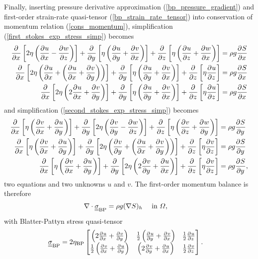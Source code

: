 Finally, inserting pressure derivative approximation (\ref{bp_pressure_gradient}) and first-order strain-rate quasi-tensor (\ref{bp_strain_rate_tensor}) into conservation of momentum relation (\ref{cons_momentum}), simplification (\ref{first_stokes_exp_stress_simp}) becomes
{\tiny
\begin{align}
  \parder{}{x} \left[2\eta \left( \parder{u}{x} - \parder{w}{z} \right) \right]  + \parder{}{y} \left[\eta \left( \parder{u}{y} + \parder{v}{x} \right) \right] + \parder{}{z} \left[\eta \left( \parder{u}{z} + \parder{w}{x} \right) \right] &= \rho g\parder{S}{x} \notag \\
  \parder{}{x} \left[2\eta \left( \parder{u}{x} + \left( \parder{u}{x} + \parder{v}{y} \right)\right) \right]  + \parder{}{y} \left[\eta \left( \parder{u}{y} + \parder{v}{x} \right) \right] + \parder{}{z} \left[\eta \parder{u}{z} \right] &= \rho g\parder{S}{x} \notag \\
  \label{first_stokes_exp_strain_simp}
  \parder{}{x} \left[2\eta \left( 2\parder{u}{x} + \parder{v}{y} \right) \right]  + \parder{}{y} \left[\eta \left( \parder{u}{y} + \parder{v}{x} \right) \right] + \parder{}{z} \left[\eta \parder{u}{z} \right] &= \rho g\parder{S}{x}
\end{align}}
and simplification (\ref{second_stokes_exp_stress_simp}) becomes 
{\tiny
\begin{align}
  \parder{}{x} \left[\eta \left( \parder{v}{x} + \parder{u}{y} \right) \right]  + \parder{}{y} \left[2\eta \left( \parder{v}{y} - \parder{w}{z} \right) \right] + \parder{}{z} \left[\eta \left( \parder{v}{z} + \parder{w}{y} \right) \right] &= \rho g \parder{S}{y} \notag \\
  \parder{}{x} \left[\eta \left( \parder{v}{x} + \parder{u}{y} \right) \right]  + \parder{}{y} \left[2\eta \left( \parder{v}{y} + \left(\parder{u}{x} + \parder{v}{y} \right)\right) \right] + \parder{}{z} \left[\eta \parder{v}{z} \right] &= \rho g \parder{S}{y} \notag \\
  \label{second_stokes_exp_strain_simp}
  \parder{}{x} \left[\eta \left( \parder{v}{x} + \parder{u}{y} \right) \right]  + \parder{}{y} \left[2\eta \left( 2\parder{v}{y} + \parder{u}{x} \right) \right] + \parder{}{z} \left[\eta \parder{v}{z} \right] &= \rho g \parder{S}{y},
\end{align}}
two equations and two unknowns $u$ and $v$.  The first-order momentum balance is therefore
\begin{align}
  \label{bp_cons_momentum}
  \nabla \cdot \ranktwo{\sigma}_{\text{BP}} &= \rho g (\nabla S)_h &&\text{ in } \Omega,
\end{align}
with Blatter-Pattyn stress quasi-tensor
\begin{align}
  \label{bp_stress_tensor}
  \ranktwo{\sigma}_{\text{BP}} &=
  2 \eta_{\text{BP}} 
  \begin{bmatrix}
       \left( 2\parder{u}{x} + \parder{v}{y} \right) & \frac{1}{2}\left( \parder{u}{y} + \parder{v}{x} \right) & \frac{1}{2} \parder{u}{z} \\
       \frac{1}{2}\left( \parder{v}{x} + \parder{u}{y} \right) & \left( 2\parder{v}{y} + \parder{u}{x} \right) & \frac{1}{2} \parder{v}{z}
     \end{bmatrix}.
\end{align}

